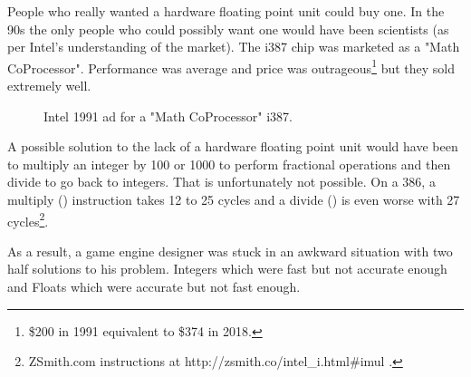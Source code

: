 \documentclass[book.tex]{subfiles}
\begin{document}
People who really wanted a hardware floating point unit could buy one. In the 90s the only people who could possibly want one would have been scientists (as per Intel's understanding of the market). The i387 chip was marketed as a "Math CoProcessor". Performance was average and price was outrageous\footnote{\$200 in 1991 equivalent to \$374 in 2018.} but they sold extremely well.\\
\begin{figure}[H]
\centering
  
  
\caption{Intel 1991 ad for a "Math CoProcessor" i387.}
\label{fig:fp_internals}
\end{figure}



\par
A possible solution to the lack of a hardware floating point unit would have been to multiply an integer by 100 or 1000 to perform fractional operations and then divide to go back to integers. That is unfortunately not possible. On a 386, a multiply () instruction takes 12 to 25 cycles and a divide () is even worse with 27 cycles\footnote{ZSmith.com instructions at http://zsmith.co/intel\_i.html\#imul .}.\\ 
\par
As a result, a game engine designer was stuck in an awkward situation with two half solutions to his problem. Integers which were fast but not accurate enough and Floats which were accurate but not fast enough.\\
\par
  
\end{document}
